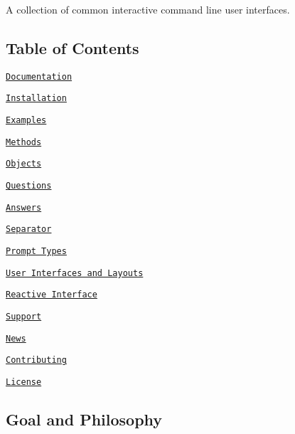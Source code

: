 \href{http://badge.fury.io/js/inquirer}{\tt } \href{http://travis-ci.org/SBoudrias/Inquirer.js}{\tt } \href{https://coveralls.io/r/SBoudrias/Inquirer.js}{\tt } \href{https://david-dm.org/SBoudrias/Inquirer.js}{\tt }

A collection of common interactive command line user interfaces.

\subsection*{Table of Contents}


\begin{DoxyEnumerate}
\item \href{#documentation}{\tt Documentation}
\begin{DoxyEnumerate}
\item \href{#installation}{\tt Installation}
\item \href{#examples}{\tt Examples}
\item \href{#methods}{\tt Methods}
\item \href{#objects}{\tt Objects}
\begin{DoxyEnumerate}
\item \href{#questions}{\tt Questions}
\item \href{#answers}{\tt Answers}
\item \href{#separator}{\tt Separator}
\end{DoxyEnumerate}
\end{DoxyEnumerate}
\begin{DoxyEnumerate}
\item \href{#prompt}{\tt Prompt Types}
\end{DoxyEnumerate}
\item \href{#layouts}{\tt User Interfaces and Layouts}
\begin{DoxyEnumerate}
\item \href{#reactive}{\tt Reactive Interface}
\end{DoxyEnumerate}
\item \href{#support}{\tt Support}
\item \href{#news}{\tt News}
\item \href{#contributing}{\tt Contributing}
\item \href{#license}{\tt License}
\end{DoxyEnumerate}

\subsection*{Goal and Philosophy}



